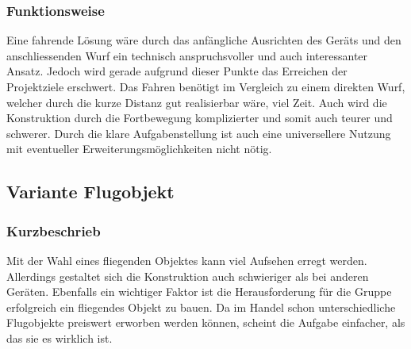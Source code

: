 \subsubsection{Funktionsweise}
Eine fahrende Lösung wäre durch das anfängliche Ausrichten des Geräts und 
den anschliessenden Wurf ein technisch anspruchsvoller und auch interessanter 
Ansatz. Jedoch wird gerade aufgrund dieser Punkte das Erreichen der 
Projektziele erschwert. Das Fahren benötigt im Vergleich zu einem direkten 
Wurf, welcher durch die kurze Distanz gut realisierbar wäre, viel Zeit. Auch 
wird die Konstruktion durch die Fortbewegung komplizierter und somit auch 
teurer und schwerer. Durch die klare Aufgabenstellung ist auch eine 
universellere Nutzung mit eventueller Erweiterungsmöglichkeiten nicht nötig. 



\clearpage

\subsection{Variante Flugobjekt}
\subsubsection{Kurzbeschrieb}
Mit der Wahl eines fliegenden Objektes kann viel Aufsehen erregt werden. 
Allerdings gestaltet sich die Konstruktion auch schwieriger als bei anderen 
Geräten. Ebenfalls ein wichtiger Faktor ist die Herausforderung für die Gruppe 
erfolgreich ein fliegendes Objekt zu bauen. Da im Handel schon 
unterschiedliche Flugobjekte preiswert erworben werden können, scheint die 
Aufgabe einfacher, als das sie es wirklich ist.

